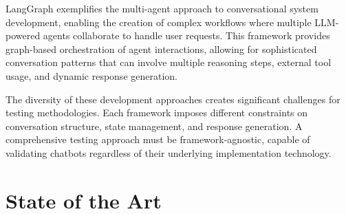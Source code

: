 LangGraph \autocite{LangGraph} exemplifies the multi-agent approach
to conversational system development,
enabling the creation of complex workflows
where multiple \ac{LLM}-powered agents collaborate to handle user requests.
This framework provides graph-based orchestration of agent interactions,
allowing for sophisticated conversation patterns
that can involve multiple reasoning steps, external tool usage, and dynamic response generation.

The diversity of these development approaches
creates significant challenges for testing methodologies.
Each framework imposes different constraints on
conversation structure, state management, and response generation.
A comprehensive testing approach must be framework-agnostic,
capable of validating chatbots 
regardless of their underlying implementation technology.

\section{State of the Art}

